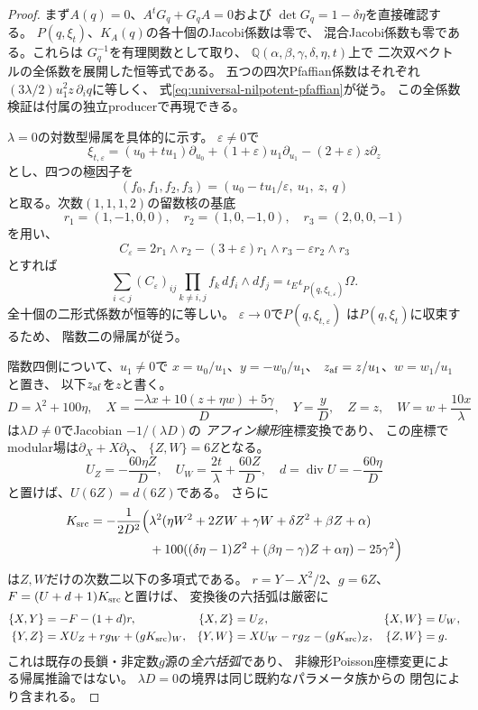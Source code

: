 \begin{proof}
まず$A(q)=0$、$A^tG_q+G_qA=0$および
$\det G_q=1-\delta\eta$を直接確認する。
$P(q,\xi_t)$、$K_A(q)$の各十個のJacobi係数は零で、
混合Jacobi係数も零である。これらは
$G_q^{-1}$を有理関数として取り、
$\mathbb Q(\alpha,\beta,\gamma,\delta,\eta,t)$上で
二次双ベクトルの全係数を展開した恒等式である。
五つの四次Pfaffian係数はそれぞれ
$(3\lambda/2)u_1^2z\,\partial_iq$に等しく、
式\eqref{eq:universal-nilpotent-pfaffian}が従う。
この全係数検証は付属の独立producerで再現できる。

$\lambda=0$の対数型帰属を具体的に示す。
$\varepsilon\ne0$で
\[
 \xi_{t,\varepsilon}=
 (u_0+tu_1)\partial_{u_0}
 +(1+\varepsilon)u_1\partial_{u_1}
 -(2+\varepsilon)z\partial_z
\]
とし、四つの極因子を
\[
 (f_0,f_1,f_2,f_3)
 =(u_0-tu_1/\varepsilon,\ u_1,\ z,\ q)
\]
と取る。次数$(1,1,1,2)$の留数核の基底
\[
 r_1=(1,-1,0,0),\quad r_2=(1,0,-1,0),
 \quad r_3=(2,0,0,-1)
\]
を用い、
\[
 C_\varepsilon=2r_1\wedge r_2
 -(3+\varepsilon)r_1\wedge r_3
 -\varepsilon r_2\wedge r_3
\]
とすれば
\[
 \sum_{i<j}(C_\varepsilon)_{ij}
  \prod_{k\ne i,j}f_k\,df_i\wedge df_j
 =\iota_E\iota_{P(q,\xi_{t,\varepsilon})}\Omega .
\]
全十個の二形式係数が恒等的に等しい。
$\varepsilon\to0$で$P(q,\xi_{t,\varepsilon})$
は$P(q,\xi_t)$に収束するため、
階数二の帰属が従う。

階数四側について、$u_1\ne0$で
$x=u_0/u_1$、$y=-w_0/u_1$、
$z_{\rm af}=z/u_1$、$w=w_1/u_1$と置き、
以下$z_{\rm af}$を$z$と書く。
\[
 D=\lambda^2+100\eta,\quad
 X=\frac{-\lambda x+10(z+\eta w)+5\gamma}{D},\quad
 Y=\frac yD,\quad Z=z,\quad W=w+\frac{10x}{\lambda}
\]
は$\lambda D\ne0$でJacobian $-1/(\lambda D)$の
\emph{アフィン線形}座標変換であり、
この座標でmodular場は$\partial_X+X\partial_Y$、
$\{Z,W\}=6Z$となる。
\[
 U_Z=-\frac{60\eta Z}{D},\quad
 U_W=\frac{2t}{\lambda}+\frac{60Z}{D},\quad
 d=\operatorname{div}U=-\frac{60\eta}{D}
\]
と置けば、$U(6Z)=d(6Z)$である。
さらに
\[
 \begin{split}
 K_{\rm src}=-\frac1{2D^2}\Bigl(
 &\lambda^2(\eta W^2+2ZW+\gamma W+
          \delta Z^2+\beta Z+\alpha)\\
 &+100((\delta\eta-1)Z^2+
          (\beta\eta-\gamma)Z+\alpha\eta)
          -25\gamma^2\Bigr)
 \end{split}
\]
は$Z,W$だけの次数二以下の多項式である。
$r=Y-X^2/2$、$g=6Z$、
$F=(U+d+1)K_{\rm src}$と置けば、
変換後の六括弧は厳密に
\[
\begin{aligned}
 \{X,Y\}&=-F-(1+d)r,&
 \{X,Z\}&=U_Z,&\{X,W\}&=U_W,\\
 \{Y,Z\}&=XU_Z+r g_W+(gK_{\rm src})_W,&
 \{Y,W\}&=XU_W-rg_Z-(gK_{\rm src})_Z,&
 \{Z,W\}&=g .
\end{aligned}
\]
これは既存の長鎖・非定数$g$源の\emph{全六括弧}であり、
非線形Poisson座標変更による帰属推論ではない。
$\lambda D=0$の境界は同じ既約なパラメータ族からの
閉包により含まれる。


\end{proof}
